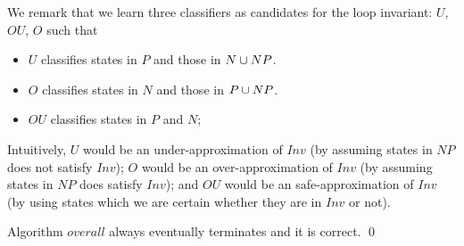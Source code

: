 We remark that we learn three classifiers as candidates for the loop invariant: $U$, $OU$, $O$ such that
\begin{itemize}
\item $U$ classifies states in $P$ and those in $N \cup NP$.
\item $O$ classifies states in $N$ and those in $P \cup NP$.
\item $OU$ classifies states in $P$ and $N$;
\end{itemize}
Intuitively, $U$ would be an under-approximation of $Inv$ (by assuming states in $NP$ does not satisfy $Inv$); 
$O$ would be an over-approximation of $Inv$ (by assuming states in $NP$ does satisfy $Inv$); 
and $OU$ would be an safe-approximation of $Inv$ (by using states which we are certain whether they are in $Inv$ or not).
\begin{example}
\end{example}


\begin{theorem}
Algorithm $overall$ always eventually terminates and it is correct. \hfill \qed
\end{theorem}
